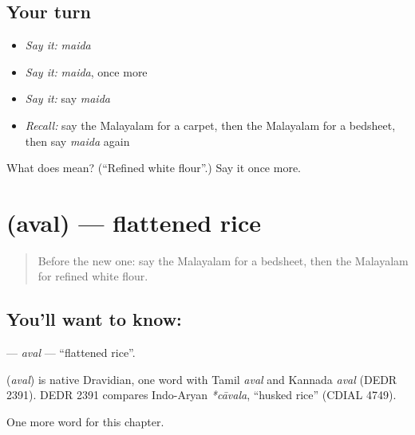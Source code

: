 \subsection*{Your turn}
\begin{itemize}
\raggedright
  \item \emph{Say it:} \emph{maida}
  \item \emph{Say it:} \emph{maida}, once more
  \item \emph{Say it:} say \emph{maida}
  \item \emph{Recall:} say the Malayalam for a carpet, then the Malayalam for a bedsheet, then say \emph{maida} again
\end{itemize}

\begin{tcolorbox}[breakable,colback=teal!4,colframe=teal!35!black,title={Before you move on}]
What does  mean? (\textquotedblleft{}Refined white flour\textquotedblright{}.) Say it once more.
\end{tcolorbox}
\section[\texorpdfstring{\ml{അവൽ} (aval)}{അവൽ (aval)}]{ (aval) — flattened rice}

\label{lesson:ML-C297-aval}



\begin{quote}
Before the new one: say the Malayalam for a bedsheet, then the Malayalam for refined white flour.
\end{quote}

\subsection*{You'll want to know: }
\textbf{} — \emph{aval} — \textquotedblleft{}flattened rice\textquotedblright{}.

\begin{cousinweb}
\textbf{} (\emph{aval}) is native Dravidian, one word with Tamil \emph{aval} and Kannada \emph{aval} (DEDR 2391). DEDR 2391 compares Indo-Aryan \emph{*cāvala}, \textquotedblleft{}husked rice\textquotedblright{} (CDIAL 4749).
\end{cousinweb}

\begin{grammarlens}[title={What you've built}]
One more word for this chapter.
\end{grammarlens}

